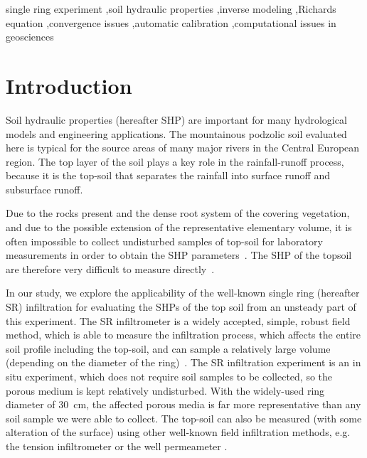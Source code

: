 \documentclass[review,times,3p,10pt]{elsarticle}
\begin{document}
\begin{frontmatter}
\begin{abstract}

\end{abstract}

\begin{keyword}
 single ring experiment \sep soil hydraulic properties \sep inverse modeling \sep Richards equation \sep convergence issues  \sep automatic calibration \sep computational issues in geosciences  


\end{keyword}

\end{frontmatter}

\linenumbers

\section{Introduction}%

Soil hydraulic properties (hereafter SHP) are important for many hydrological models and engineering applications. The mountainous podzolic soil evaluated here is typical for the source areas of many major rivers in the Central European region. The top layer of the soil plays a key role in the rainfall-runoff process, because it is the top-soil that separates the rainfall into surface runoff and subsurface runoff. 


Due to the rocks present and the dense root system of the covering vegetation, and due to the possible extension of the representative elementary volume, it is often impossible to collect undisturbed samples of top-soil for laboratory measurements in order to obtain the SHP parameters~\citep{Jacka1}. The SHP of the topsoil are therefore very difficult to measure directly~\citep{Fodor, Jacka1}. 


 
{In our study, we explore the applicability of the well-known single ring (hereafter SR) infiltration for evaluating the SHPs of the top soil from an unsteady part of this experiment.}
The SR infiltrometer is a widely accepted, simple, robust field method, which is able to measure the infiltration process, which affects the entire soil profile including the top-soil,  and can sample a relatively large volume (depending on the diameter of the ring)~\citep{Cheng,ReynoldsWD}.  The SR infiltration experiment is an in situ experiment, which does not require soil samples to be collected, so the porous medium is kept relatively undisturbed. With the widely-used ring diameter of 30~cm, the affected porous media is far more representative than any soil sample we were able to collect. The top-soil can also be measured (with some alteration of the surface) using other well-known field infiltration methods, e.g. the tension infiltrometer or the well permeameter  \citep{AnguloJaramillo,ReynoldsWDGP}. 
\end{document}
